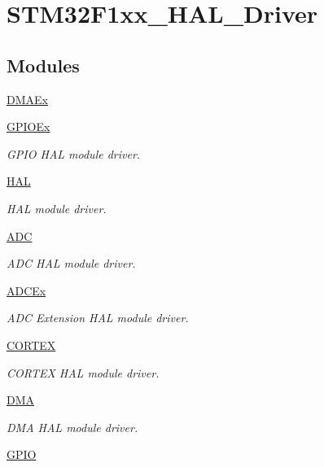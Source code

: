\hypertarget{group___s_t_m32_f1xx___h_a_l___driver}{}\section{S\+T\+M32\+F1xx\+\_\+\+H\+A\+L\+\_\+\+Driver}
\label{group___s_t_m32_f1xx___h_a_l___driver}
\subsection*{Modules}
\begin{DoxyCompactItemize}
\item 
\hyperlink{group___d_m_a_ex}{D\+M\+A\+Ex}
\item 
\hyperlink{group___g_p_i_o_ex}{G\+P\+I\+O\+Ex}
\begin{DoxyCompactList}\small\item\em G\+P\+IO H\+AL module driver. \end{DoxyCompactList}\item 
\hyperlink{group___h_a_l}{H\+AL}
\begin{DoxyCompactList}\small\item\em H\+AL module driver. \end{DoxyCompactList}\item 
\hyperlink{group___a_d_c}{A\+DC}
\begin{DoxyCompactList}\small\item\em A\+DC H\+AL module driver. \end{DoxyCompactList}\item 
\hyperlink{group___a_d_c_ex}{A\+D\+C\+Ex}
\begin{DoxyCompactList}\small\item\em A\+DC Extension H\+AL module driver. \end{DoxyCompactList}\item 
\hyperlink{group___c_o_r_t_e_x}{C\+O\+R\+T\+EX}
\begin{DoxyCompactList}\small\item\em C\+O\+R\+T\+EX H\+AL module driver. \end{DoxyCompactList}\item 
\hyperlink{group___d_m_a}{D\+MA}
\begin{DoxyCompactList}\small\item\em D\+MA H\+AL module driver. \end{DoxyCompactList}\item 
\hyperlink{group___g_p_i_o}{G\+P\+IO}

\end{DoxyCompactItemize}

